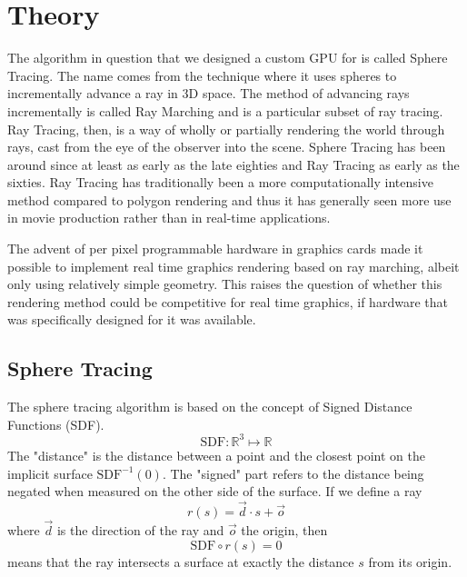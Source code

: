 \chapter{Theory}

	The algorithm in question that we designed a custom GPU for is called
	Sphere Tracing\cite{Hart1996}. The name comes from the technique where it uses spheres to
	incrementally advance a ray in 3D space. The method of advancing rays
	incrementally is called Ray Marching and is a particular subset of ray
	tracing.\cite{Whitted1980} Ray Tracing, then, is a way of wholly or
	partially rendering the world through rays, cast from the eye of the
	observer into the scene.  Sphere Tracing has been around since at least as
	early as the late eighties and Ray Tracing as early as the
	sixties\cite{Hart1989,Appel1968}. Ray Tracing has traditionally been a 
	more computationally intensive method compared to polygon
	rendering\cite{Wylie1967} and thus it has generally seen more use in movie  
	production rather than in real-time applications.\cite{ref_needed?} 

	
	The advent of per pixel programmable hardware in graphics cards made it 
	possible to implement real time graphics rendering based on ray	marching, 
	albeit only using relatively simple geometry. This raises the question of 
	whether this rendering method could be competitive for real time graphics, 
	if hardware that was specifically designed for it was available.
	
		
	\section{Sphere Tracing} 
	
		\begin{minipage}{0.6\textwidth} 
		
			The sphere tracing algorithm is based on the concept of Signed Distance Functions (SDF).
			$$\text{SDF}:\mathbb{R}^{3}\mapsto\mathbb{R}$$ 
			The "distance" is
			the distance between a point and the closest point on the implicit
			surface $\text{SDF}^{-1}(0)$. The "signed" part refers to the
			distance being negated when measured on the other side of the
			surface. If we define a ray $$r(s) = \vec{d} \cdot s + \vec{o}$$
			where $\vec{d}$ is the direction of the ray and $\vec{o}$ the origin,	then $$\text{SDF}\circ r(s) = 0$$ means that the ray
			intersects a surface at exactly the distance $s$ from its origin.
		
		\end{minipage} 
		
